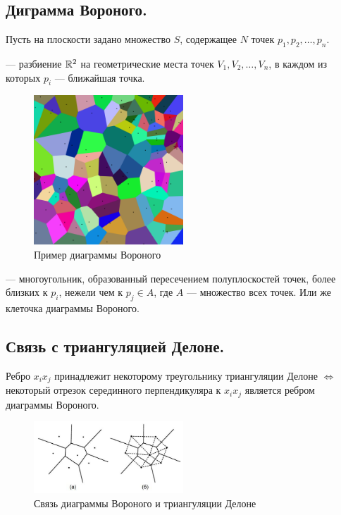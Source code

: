 \subsection{Диграмма Вороного.}
Пусть на плоскости задано множество $S$, содержащее $N$ точек $p_1, p_2, \ldots, p_{n}$.
\begin{definition}
   --- разбиение $\mathbb{R}^2$ на геометрические места точек $V_1, V_2, \ldots, V_{n}$,
  в каждом из которых $p_{i}$ --- ближайшая точка.
\end{definition}
\begin{figure}[H]    
  \centering    
  \includegraphics[width=0.5\textwidth]{figures/voronoiExample.png}    
  \caption*{Пример диаграммы Вороного}        
\end{figure} 

\begin{definition}
   --- многоугольник, образованный пересечением полуплоскостей точек,
  более близких к $p_{i}$, нежели чем к $p_{j} \in A$, где $A$ --- множество всех точек. Или же
  клеточка диаграммы Вороного.
\end{definition}

\subsection{Связь с триангуляцией Делоне.}
\begin{theorem}
  Ребро $x_{i}x_{j}$ принадлежит некоторому треугольнику триангуляции Делоне $\iff$ некоторый отрезок
  серединного перпендикуляра к $x_{i}x_{j}$ является ребром диаграммы Вороного.
\end{theorem}
\begin{figure}[H]    
  \centering    
  \includegraphics[width=0.5\textwidth]{figures/voronoiDelone.jpg}    
  \caption*{Связь диаграммы Вороного и триангуляции Делоне}        
\end{figure} 

